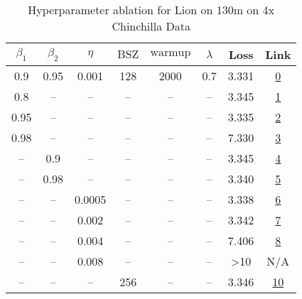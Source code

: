 \begin{table}[H]
\centering
\caption{Hyperparameter ablation for Lion on 130m on 4x Chinchilla Data}
\label{tab:ablation_lion_130m_4}
\begin{tabular}{cccccccc}
\toprule
$\beta_1$ & $\beta_2$ & $\eta$ & $\mathrm{BSZ}$ & $\mathrm{warmup}$ & $\lambda$ & Loss & Link \\
\midrule
0.9 & 0.95 & 0.001 & 128 & 2000 & 0.7 & 3.331 & \href{https://wandb.ai/stanford-mercury/optimizer-scaling/runs/sweep-130m-10B-liondd8061alr0.001-wd0.7-minlr0-warmup2000-b10.9--72b789}{0} \\
\midrule
0.8 & -- & -- & -- & -- & -- & 3.345 & \href{https://wandb.ai/stanford-mercury/optimizer-scaling/runs/sweep-130m-10B-lion6ebc4dlr0.001-wd0.7-minlr0-warmup2000-b10.8-b-9ccc4b}{1} \\
0.95 & -- & -- & -- & -- & -- & 3.335 & \href{https://wandb.ai/stanford-mercury/optimizer-scaling/runs/sweep-130m-10B-lionk6ee825lr0.001-wd0.7-minlr0-warmup2000-b10.95-4aeb28}{2} \\
0.98 & -- & -- & -- & -- & -- & 7.330 & \href{https://wandb.ai/stanford-mercury/optimizer-scaling/runs/sweep-130m-10B-lionk98635alr0.001-wd0.7-minlr0-warmup2000-b10.98-20924d}{3} \\
-- & 0.9 & -- & -- & -- & -- & 3.345 & \href{https://wandb.ai/stanford-mercury/optimizer-scaling/runs/sweep-130m-10B-lioncda5edlr0.001-wd0.7-minlr0-warmup2000-b10.9-b-6a3aec}{4} \\
-- & 0.98 & -- & -- & -- & -- & 3.340 & \href{https://wandb.ai/stanford-mercury/optimizer-scaling/runs/sweep-130m-10B-lion489f64lr0.001-wd0.7-minlr0-warmup2000-b10.9-b-e5b223}{5} \\
-- & -- & 0.0005 & -- & -- & -- & 3.338 & \href{https://wandb.ai/stanford-mercury/optimizer-scaling/runs/sweep-130m-10B-lionfc33e8lr0.0005-wd0.7-minlr0-warmup2000-b10.9--abc4e2}{6} \\
-- & -- & 0.002 & -- & -- & -- & 3.342 & \href{https://wandb.ai/stanford-mercury/optimizer-scaling/runs/sweep-130m-10B-lionp2ece3elr0.002-wd0.7-minlr0-warmup2000-b10.9--9f5952}{7} \\
-- & -- & 0.004 & -- & -- & -- & 7.406 & \href{https://wandb.ai/stanford-mercury/optimizer-scaling/runs/sweep-130m-10B-liond13cd19lr0.004-wd0.7-minlr0-warmup2000-b10.9--ef33c1}{8} \\
-- & -- & 0.008 & -- & -- & -- & >10 & N/A \\
-- & -- & -- & 256 & -- & -- & 3.346 & \href{https://wandb.ai/stanford-mercury/optimizer-scaling/runs/sweep-130m-10B-lione0352dlr0.001-wd0.7-minlr0-warmup2000-b10.9-b-1bda13}{10} \\

\end{tabular}
\end{table}

